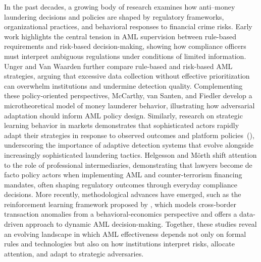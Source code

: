 In the past decades, a growing body of research examines how anti–money laundering decisions and policies are shaped by regulatory frameworks, organizational practices, and behavioral responses to financial crime risks. Early work \parencite{ross2007money} highlights the central tension in AML supervision between rule-based requirements and risk-based decision-making, showing how compliance officers must interpret ambiguous regulations under conditions of limited information. Unger and Van Waarden \parencite*{unger2009dodge} further compare rule-based and risk-based AML strategies, arguing that excessive data collection without effective prioritization can overwhelm institutions and undermine detection quality. Complementing these policy-oriented perspectives, McCarthy, van Santen, and Fiedler \parencite*{mccarthy2015modeling} develop a microtheoretical model of money launderer behavior, illustrating how adversarial adaptation should inform AML policy design. Similarly, research on strategic learning behavior in markets demonstrates that sophisticated actors rapidly adapt their strategies in response to observed outcomes and platform policies~(\cite{xu2022ni}), underscoring the importance of adaptive detection systems that evolve alongside increasingly sophisticated laundering tactics. Helgesson and Mörth \parencite*{helgesson2016involuntary} shift attention to the role of professional intermediaries, demonstrating that lawyers become de facto policy actors when implementing AML and counter-terrorism financing mandates, often shaping regulatory outcomes through everyday compliance decisions. More recently, methodological advances have emerged, such as the reinforcement learning framework proposed by \parencite{rao2025reinforcement}, which models cross-border transaction anomalies from a behavioral-economics perspective and offers a data-driven approach to dynamic AML decision-making. Together, these studies reveal an evolving landscape in which AML effectiveness depends not only on formal rules and technologies but also on how institutions interpret risks, allocate attention, and adapt to strategic adversaries.

